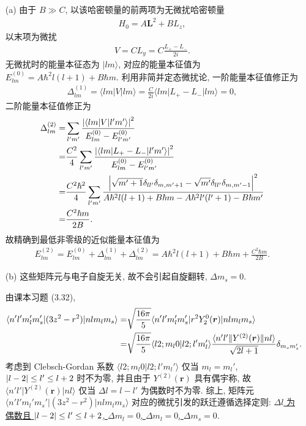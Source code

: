 \documentclass{assignment}
\begin{document}
\begin{sol}
    \begin{itemize}
        \item[(a)] 由于 $B\gg C$, 以该哈密顿量的前两项为无微扰哈密顿量
        \begin{align}
            H_0=A\bm{L}^2+BL_z,
        \end{align}
        以末项为微扰
        \begin{align}
            V=CL_y=C\frac{L_+-L_-}{2i}.
        \end{align}
        无微扰时的能量本征态为 $\lvert lm\rangle$, 对应的能量本征值为 $E_{lm}^{(0)}=A\hbar^2l(l+1)+B\hbar m$.
        利用非简并定态微扰论, 一阶能量本征值修正为
        \begin{align}
            \Delta_{lm}^{(1)}=\langle lm\rvert V\lvert lm\rangle=\frac{C}{2i}\langle lm\rvert L_+-L_-\lvert lm\rangle=0,
        \end{align}
        二阶能量本征值修正为
        \begin{align}
            \notag\Delta_{lm}^{(2)}=&\sum_{l'm'}\frac{\left\lvert\langle lm\rvert V\lvert l'm'\rangle\right\rvert^2}{E_{lm}^{(0)}-E_{l'm'}^{(0)}}\\
            \notag=&\frac{C^2}{4}\sum_{l'm'}\frac{\left\lvert\langle lm\rvert L_+-L_-\lvert l'm'\rangle\right\rvert^2}{E_{lm}^{(0)}-E_{l'm'}^{(0)}}\\
            \notag=&\frac{C^2\hbar^2}{4}\sum_{l'm'}\frac{\left\lvert\sqrt{m'+1}\delta_{ll'}\delta_{m,m'+1}-\sqrt{m'}\delta_{ll'}\delta_{m,m'-1}\right\rvert^2}{A\hbar^2l(l+1)+B\hbar m-A\hbar^2l'(l'+1)-B\hbar m'}\\
            \notag=&\frac{C^2\hbar m}{2B}.
        \end{align}
        故精确到最低非零级的近似能量本征值为
        \begin{align}
            E_{lm}^{(2)}=E_{lm}^{(0)}+\Delta_{lm}^{(1)}+\Delta_{lm}^{(2)}=A\hbar^2l(l+1)+B\hbar m+\frac{C^2\hbar m}{2B}.
        \end{align}
        \item[(b)] 这些矩阵元与电子自旋无关, 故不会引起自旋翻转, $\Delta m_s=0$.

        由课本习题 (3.32),
        \begin{align}
            \notag\langle n'l'm_l'm_s'\rvert(3z^2-r^2)\lvert nlm_lm_s\rangle=&\sqrt{\frac{16\pi}{5}}\langle n'l'm_l'm_s'\rvert r^2Y_2^0(\bm{r})\lvert nlm_lm_s\rangle\\
            =&\sqrt{\frac{16\pi}{5}}\langle l2;m_l0\vert l2;l'm_l'\rangle\frac{\langle n'l'\rVert Y^{(2)}(\bm{r})\lVert nl\rangle}{\sqrt{2l+1}}\delta_{m_sm_s'}.
        \end{align}
        考虑到 Clebsch-Gordan 系数 $\langle l2;m_l0\vert l2;l'm_l'\rangle$ 仅当 $m_l=m_l'$, $\left\lvert l-2\right\rvert\leq l'\leq l+2$ 时不为零, 并且由于 $Y^{(2)}(\bm{r})$ 具有偶宇称, 故 $\langle n'l'\rvert Y^{(2)}(\bm{r})\lvert nl\rangle$ 仅当 $\Delta l=l-l'$ 为偶数时不为零.
        综上, 矩阵元 $\langle n'l'm_l'm_s'\rvert(3z^2-r^2)\lvert nlm_lm_s\rangle$ 对应的微扰引发的跃迁遵循选择定则: \uline{$\Delta l$ 为偶数且 $\left\lvert l-2\right\rvert\leq l'\leq l+2$, $\Delta m_l=0$, $\Delta m_l=0$, $\Delta m_s=0$}.


\end{itemize}
\end{sol}
\end{document}
